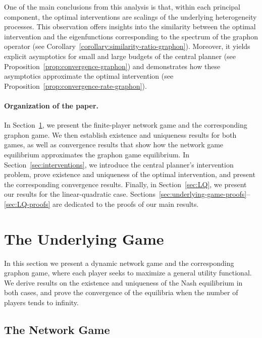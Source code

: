 \documentclass[11pt]{article}
\numberwithin{equation}{section}
\begin{document}
One of the main conclusions from this analysis is that, within each principal component, the optimal interventions are scalings of the underlying heterogeneity processes. This observation offers insights into the similarity between the optimal intervention and the eigenfunctions corresponding to the spectrum of the graphon operator (see Corollary~\ref{corollary:similarity-ratio-graphon}). Moreover, it yields explicit asymptotics for small and large budgets of the central planner (see Proposition~\ref{prop:convergence-graphon}) and demonstrates how these asymptotics approximate the optimal intervention (see Proposition~\ref{prop:convergence-rate-graphon}).

\paragraph{Organization of the paper.} In Section~\ref{sec:underlying-game}, we present the finite-player network game and the corresponding graphon game. We then establish existence and uniqueness results for both games, as well as convergence results that show how the network game equilibrium approximates the graphon game equilibrium. In Section~\ref{sec:interventions}, we introduce the central planner's intervention problem, prove existence and uniqueness of the optimal intervention, and present the corresponding convergence results. Finally, in Section~\ref{sec:LQ}, we present our results for the linear-quadratic case. Sections~\ref{sec:underlying-game-proofs}--\ref{sec:LQ-proofs} are dedicated to the proofs of our main results.


\section{The Underlying Game}\label{sec:underlying-game}
In this section we present a dynamic network game and the corresponding graphon game, where each player seeks to maximize a general utility functional. We derive results on the existence and uniqueness of the Nash equilibrium in both cases, and prove the convergence of the equilibria when the number of players tends to infinity.  
\subsection{The Network Game}\label{subsec:definition-finite-player-game}
\end{document}
